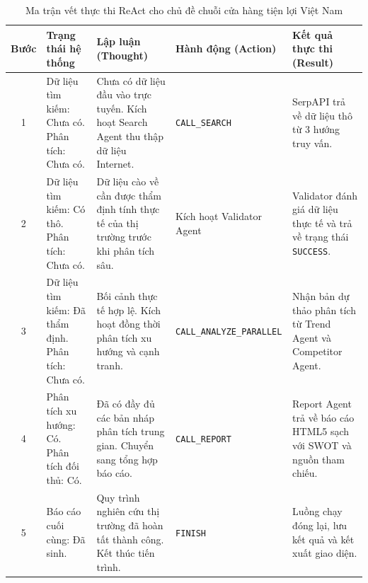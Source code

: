 \documentclass[11pt,a4paper]{article}
\begin{document}
\begin{itemize}
\begin{table}[H]
\centering
\caption{Ma trận vết thực thi ReAct cho chủ đề chuỗi cửa hàng tiện lợi Việt Nam}
\label{tab:react_trace}
\footnotesize
\begin{tabular}{cp{3cm}p{3cm}p{4cm}p{3.5cm}}
\toprule
\textbf{Bước} & \textbf{Trạng thái hệ thống} & \textbf{Lập luận (Thought)} & \textbf{Hành động (Action)} & \textbf{Kết quả thực thi (Result)} \\
\midrule
1 & Dữ liệu tìm kiếm: Chưa có. Phân tích: Chưa có. & Chưa có dữ liệu đầu vào trực tuyến. Kích hoạt Search Agent thu thập dữ liệu Internet. & \texttt{CALL\_SEARCH} & SerpAPI trả về dữ liệu thô từ 3 hướng truy vấn. \\
\hline
2 & Dữ liệu tìm kiếm: Có thô. Phân tích: Chưa có. & Dữ liệu cào về cần được thẩm định tính thực tế của thị trường trước khi phân tích sâu. & Kích hoạt Validator Agent & Validator đánh giá dữ liệu thực tế và trả về trạng thái \texttt{SUCCESS}. \\
\hline
3 & Dữ liệu tìm kiếm: Đã thẩm định. Phân tích: Chưa có. & Bối cảnh thực tế hợp lệ. Kích hoạt đồng thời phân tích xu hướng và cạnh tranh. & \texttt{CALL\_ANALYZE\_PARALLEL} & Nhận bản dự thảo phân tích từ Trend Agent và Competitor Agent. \\
\hline
4 & Phân tích xu hướng: Có. Phân tích đối thủ: Có. & Đã có đầy đủ các bản nháp phân tích trung gian. Chuyển sang tổng hợp báo cáo. & \texttt{CALL\_REPORT} & Report Agent trả về báo cáo HTML5 sạch với SWOT và nguồn tham chiếu. \\
\hline
5 & Báo cáo cuối cùng: Đã sinh. & Quy trình nghiên cứu thị trường đã hoàn tất thành công. Kết thúc tiến trình. & \texttt{FINISH} & Luồng chạy đóng lại, lưu kết quả và kết xuất giao diện. \\
\bottomrule
\end{tabular}
\end{table}


\end{itemize}
\end{document}
